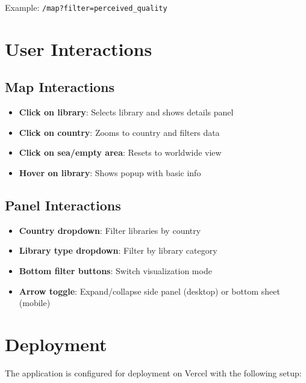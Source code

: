 \documentclass[11pt,a4paper]{article}
\begin{document}
Example: \texttt{/map?filter=perceived\_quality}

\section{User Interactions}

\subsection{Map Interactions}

\begin{itemize}
    \item \textbf{Click on library}: Selects library and shows details panel
    \item \textbf{Click on country}: Zooms to country and filters data
    \item \textbf{Click on sea/empty area}: Resets to worldwide view
    \item \textbf{Hover on library}: Shows popup with basic info
\end{itemize}

\subsection{Panel Interactions}

\begin{itemize}
    \item \textbf{Country dropdown}: Filter libraries by country
    \item \textbf{Library type dropdown}: Filter by library category
    \item \textbf{Bottom filter buttons}: Switch visualization mode
    \item \textbf{Arrow toggle}: Expand/collapse side panel (desktop) or bottom sheet (mobile)
\end{itemize}

\section{Deployment}

The application is configured for deployment on Vercel with the following setup:
\end{document}
